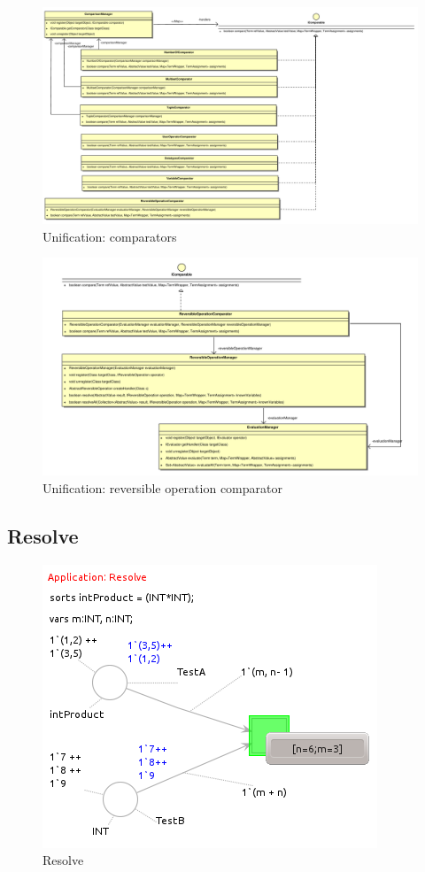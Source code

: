 \begin{figure}[!htb]
  \includegraphics[scale=0.35]{img/comparators.pdf}
  \caption{Unification: comparators}\label{fig:comparators}
\end{figure}

\begin{figure}[!htb]
  \includegraphics[scale=0.4]{img/reversibleOperationComparator.pdf}
  \caption{Unification: reversible operation comparator}\label{fig:reversible-operation-comparator}
\end{figure}

\subsection{Resolve}\label{subs:resolve}

\begin{figure}[!htb]
  \includegraphics{img/resolve.png}
  \caption{Resolve}\label{fig:resolve}
\end{figure}

